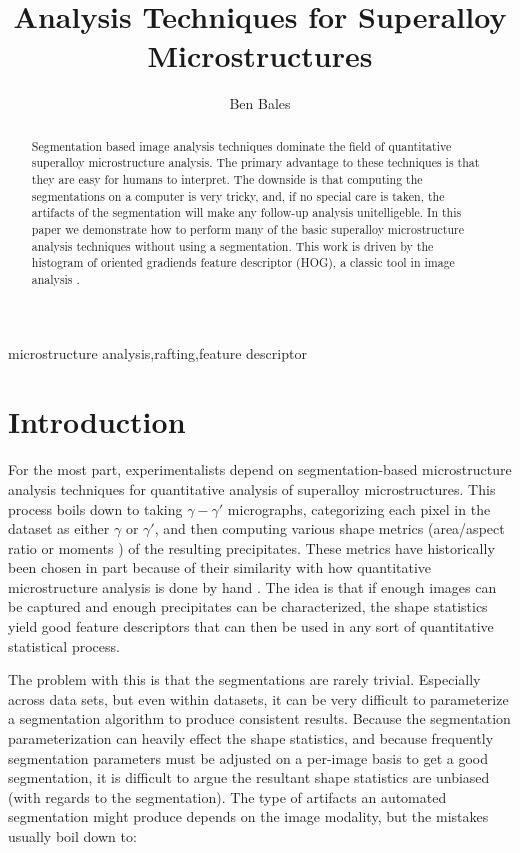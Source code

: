 \documentclass[review]{elsarticle}
\date{}
\begin{document}
	\begin{frontmatter}
		\title{Analysis Techniques for Superalloy Microstructures}

		\author{Ben Bales}
		\address{University of California Santa Barbara}

		\begin{abstract}
			Segmentation based image analysis techniques dominate the field of quantitative superalloy microstructure analysis. The primary advantage to these techniques is that they are easy for humans to interpret. The downside is that computing the segmentations on a computer is very tricky, and, if no special care is taken, the artifacts of the segmentation will make any follow-up analysis unitelligeble. In this paper we demonstrate how to perform many of the basic superalloy microstructure analysis techniques without using a segmentation. This work is driven by the histogram of oriented gradiends feature descriptor (HOG), a classic tool in image analysis \cite{gradtex, hog, girsh}.
		\end{abstract}

		\begin{keyword}
			microstructure analysis\sep rafting\sep feature descriptor
		\end{keyword}
	\end{frontmatter}

	\section{Introduction}
	For the most part, experimentalists depend on segmentation-based microstructure analysis techniques for quantitative analysis of superalloy microstructures. This process boils down to taking $\gamma-\gamma'$ micrographs, categorizing each pixel in the dataset as either $\gamma$ or $\gamma'$, and then computing various shape metrics (area/aspect ratio \cite{underwood} or moments \cite{twoDM, threeDM}) of the resulting precipitates. These metrics have historically been chosen in part because of their similarity with how quantitative microstructure analysis is done by hand \cite{sluytman}. The idea is that if enough images can be captured and enough precipitates can be characterized, the shape statistics yield good feature descriptors that can then be used in any sort of quantitative statistical process.

	The problem with this is that the segmentations are rarely trivial. Especially across data sets, but even within datasets, it can be very difficult to parameterize a segmentation algorithm to produce consistent results. Because the segmentation parameterization can heavily effect the shape statistics, and because frequently segmentation parameters must be adjusted on a per-image basis to get a good segmentation, it is difficult to argue the resultant shape statistics are unbiased (with regards to the segmentation). The type of artifacts an automated segmentation might produce depends on the image modality, but the mistakes usually boil down to:
\end{document}

